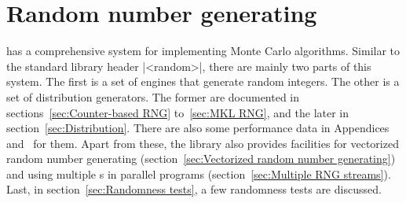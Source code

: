 %
%
%
%

\chapter{Random number generating}
\label{chap:Random number generating}

\mckl has a comprehensive \rng system for implementing Monte Carlo algorithms.
Similar to the standard library header |<random>|, there are mainly two parts
of this system. The first is a set of \rng{} engines that generate random
integers. The other is a set of distribution generators. The former are
documented in sections~\ref{sec:Counter-based RNG} to~\ref{sec:MKL RNG}, and
the later in section~\ref{sec:Distribution}. There are also some performance
data in Appendices~
and~ for them. Apart from these, the
library also provides facilities for vectorized random number generating
(section~\ref{sec:Vectorized random number generating}) and using multiple
\rng{}s in parallel programs (section~\ref{sec:Multiple RNG streams}). Last, in
section~\ref{sec:Randomness tests}, a few randomness tests are discussed.

